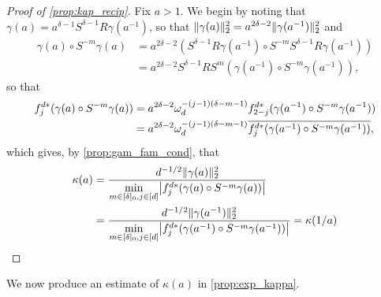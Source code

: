 \begin{proof}[Proof of \cref{prop:kap_recip}]
  Fix $a > 1$.  We begin by noting that $\gamma(a) = a^{\delta - 1} S^{\delta - 1} R \gamma(a^{-1})$, so that $\lVert\gamma(a)\rVert_2^2 = a^{2 \delta - 2} \lVert\gamma(a^{-1})\rVert_2^2$ and
  \begin{align*}
    \gamma(a) \circ S^{-m} \gamma(a) &= a^{2 \delta - 2} \left(S^{\delta - 1} R \gamma(a^{-1}) \circ S^{-m} S^{\delta - 1} R \gamma(a^{-1})\right) \\
    &= a^{2 \delta - 2} S^{\delta - 1} R S^m (\gamma(a^{-1}) \circ S^{-m} \gamma(a^{-1})),
  \end{align*}
  so that
  \begin{align*}
    f_j^{d *} (\gamma(a) \circ S^{-m} \gamma(a)) &= a^{2 \delta - 2} \omega_d^{-(j - 1) (\delta - m - 1)} f_{2 - j}^{d *} (\gamma(a^{-1}) \circ S^{-m} \gamma(a^{-1})) \\
    &= a^{2 \delta - 2} \omega_d^{-(j - 1) (\delta - m - 1)} \overline{f_j^{d *} (\gamma(a^{-1}) \circ S^{-m} \gamma(a^{-1}))},
  \end{align*}
  which gives, by \cref{prop:gam_fam_cond}, that
  \begin{align*}
    \kappa(a) &= \dfrac{d^{-1/2} \norm{\gamma(a)}_2^2}{\min\limits_{m \in [\delta]_0, j \in [d]} \abs*{f_j^{d*} (\gamma(a) \circ S^{-m} \gamma(a))}} \\ %
    &= \dfrac{d^{-1/2} \norm{\gamma(a^{-1})}_2^2}{\min\limits_{m \in [\delta]_0, j \in [d]} \abs*{f_j^{d*} (\gamma(a^{-1}) \circ S^{-m} \gamma(a^{-1}))}} = \kappa(1 / a)
  \end{align*}  
\end{proof}

We now produce an estimate of $\kappa(a)$ in \cref{prop:exp_kappa}.

